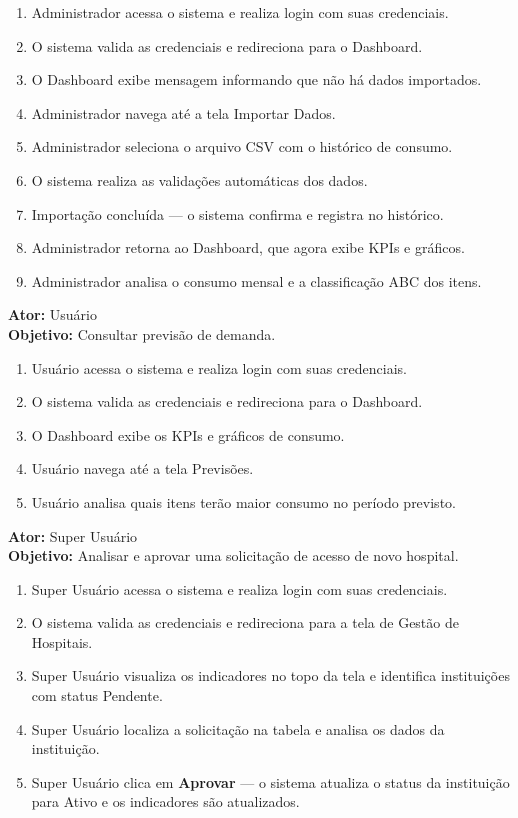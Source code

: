 \documentclass[12pt,a4paper]{article}
\begin{document}
\begin{enumerate}
    \item Administrador acessa o sistema e realiza login com suas credenciais.
    \item O sistema valida as credenciais e redireciona para o Dashboard.
    \item O Dashboard exibe mensagem informando que não há dados importados.
    \item Administrador navega até a tela Importar Dados.
    \item Administrador seleciona o arquivo CSV com o histórico de consumo.
    \item O sistema realiza as validações automáticas dos dados.
    \item Importação concluída — o sistema confirma e registra no histórico.
    \item Administrador retorna ao Dashboard, que agora exibe KPIs e gráficos.
    \item Administrador analisa o consumo mensal e a classificação ABC dos itens.
\end{enumerate}

\vspace{0.4cm}
\noindent\textbf{Ator:} Usuário \\
\textbf{Objetivo:} Consultar previsão de demanda.

\begin{enumerate}
    \item Usuário acessa o sistema e realiza login com suas credenciais.
    \item O sistema valida as credenciais e redireciona para o Dashboard.
    \item O Dashboard exibe os KPIs e gráficos de consumo.
    \item Usuário navega até a tela Previsões.
    \item Usuário analisa quais itens terão maior consumo no período previsto.
\end{enumerate}

\vspace{0.4cm}
\noindent\textbf{Ator:} Super Usuário \\
\textbf{Objetivo:} Analisar e aprovar uma solicitação de acesso de novo hospital.

\begin{enumerate}
    \item Super Usuário acessa o sistema e realiza login com suas credenciais.
    \item O sistema valida as credenciais e redireciona para a tela de Gestão de Hospitais.
    \item Super Usuário visualiza os indicadores no topo da tela e identifica instituições com status Pendente.
    \item Super Usuário localiza a solicitação na tabela e analisa os dados da instituição.
    \item Super Usuário clica em \textbf{Aprovar} — o sistema atualiza o status da instituição para Ativo e os indicadores são atualizados.
\end{enumerate}
\end{document}
